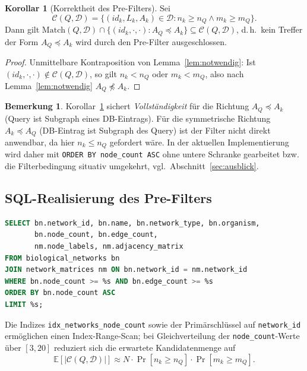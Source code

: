 \documentclass[a4paper,12pt]{article}
\theoremstyle{definition}
\newtheorem{bemerkung}{Bemerkung}
\newtheorem{korollar}{Korollar}
\begin{document}
\begin{korollar}[Korrektheit des Pre-Filters]
	\label{kor:prefilter}
	Sei
	\[
	\mathcal{C}(Q,\mathcal{D}) = \{(id_k,L_k,A_k)\in\mathcal{D} : n_k \ge n_Q \wedge m_k \ge m_Q\}.
	\]
	Dann gilt $\mathrm{Match}(Q,\mathcal{D}) \cap \{(id_k,\cdot,\cdot): A_Q \preceq A_k\} \subseteq \mathcal{C}(Q,\mathcal{D})$, d.\,h.\ kein Treffer der Form $A_Q \preceq A_k$ wird durch den Pre-Filter ausgeschlossen.
\end{korollar}

\begin{proof}
	Unmittelbare Kontraposition von Lemma~\ref{lem:notwendig}: Ist $(id_k,\cdot,\cdot) \notin \mathcal{C}(Q,\mathcal{D})$, so gilt $n_k < n_Q$ oder $m_k < m_Q$, also nach Lemma~\ref{lem:notwendig} $A_Q \not\preceq A_k$.
\end{proof}

\begin{bemerkung}
	Korollar~\ref{kor:prefilter} sichert \emph{Vollständigkeit} für die Richtung $A_Q \preceq A_k$ (Query ist Subgraph eines DB-Eintrags). Für die symmetrische Richtung $A_k \preceq A_Q$ (DB-Eintrag ist Subgraph des Query) ist der Filter nicht direkt anwendbar, da hier $n_k \le n_Q$ gefordert wäre. In der aktuellen Implementierung wird daher mit \texttt{ORDER BY node\_count ASC} ohne untere Schranke gearbeitet bzw. die Filterbedingung situativ umgekehrt, vgl.\ Abschnitt~\ref{sec:ausblick}.
\end{bemerkung}

\subsection{SQL-Realisierung des Pre-Filters}

\begin{lstlisting}[language=SQL, caption=Pre-Filter-Query]
SELECT bn.network_id, bn.name, bn.network_type, bn.organism,
       bn.node_count, bn.edge_count,
       nm.node_labels, nm.adjacency_matrix
FROM biological_networks bn
JOIN network_matrices nm ON bn.network_id = nm.network_id
WHERE bn.node_count >= %s AND bn.edge_count >= %s
ORDER BY bn.node_count ASC
LIMIT %s;
\end{lstlisting}

Die Indizes \texttt{idx\_networks\_node\_count} sowie der Primärschlüssel auf \texttt{network\_id} ermöglichen einen Index-Range-Scan; bei Gleichverteilung der \texttt{node\_count}-Werte über $[3,20]$ reduziert sich die erwartete Kandidatenmenge auf
\[
\mathbb{E}[|\mathcal{C}(Q,\mathcal{D})|] \approx N \cdot \Pr[n_k \ge n_Q] \cdot \Pr[m_k \ge m_Q].
\]
\end{document}
